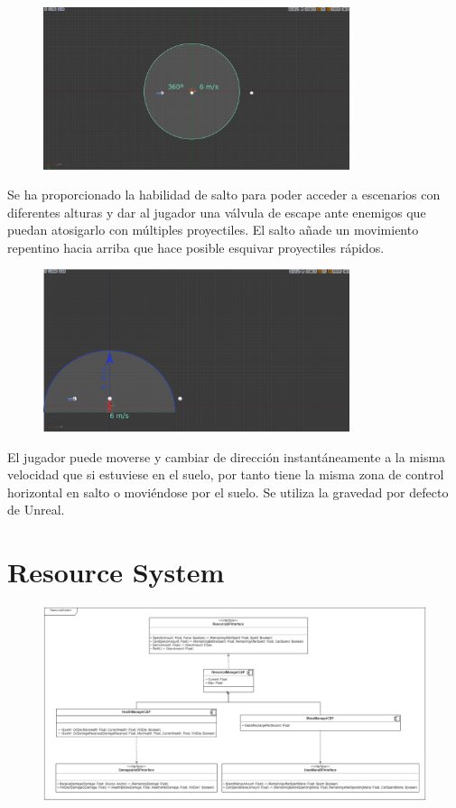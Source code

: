 \documentclass[12pt]{report}
\begin{document}
\begin{figure}[H]
    \centering
    \includegraphics[width=0.8\textwidth]{movement}
\end{figure}

Se ha proporcionado la habilidad de salto para poder acceder a escenarios con diferentes alturas y dar al jugador una válvula de escape ante enemigos que puedan atosigarlo con múltiples proyectiles. El salto añade un movimiento repentino hacia arriba que hace posible esquivar proyectiles rápidos. 

\begin{figure}[H]
    \centering
    \includegraphics[width=0.8\textwidth]{movement_jump}
\end{figure}

El jugador puede moverse y cambiar de dirección instantáneamente a la misma velocidad que si estuviese en el suelo, por tanto tiene la misma zona de control horizontal en salto o moviéndose por el suelo. Se utiliza la gravedad por defecto de Unreal.

\section{Resource System}

\begin{figure}[H]
    \centering
    \includegraphics[width=1\textwidth]{resources_diagram}
\end{figure}
\end{document}
